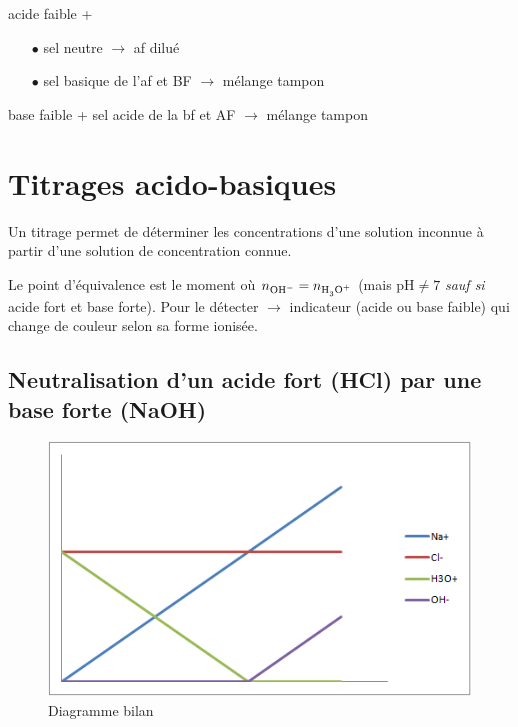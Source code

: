 \documentclass[11pt,a4paper,french]{article}
\begin{document}
acide faible +
\begin{itemize}
\item[$\bullet$] sel neutre $\rightarrow$ af dilué
\item[$\bullet$] sel basique de l'af et BF $\rightarrow$ mélange tampon
\end{itemize}

base faible + sel acide de la bf et AF $\rightarrow$ mélange tampon

\section{Titrages acido-basiques}
Un titrage permet de déterminer les concentrations d'une solution inconnue à partir d'une solution de concentration connue.

Le point d'équivalence est le moment où $n_{\ce{OH-}} = n_{\ce{H3O+}}$ (mais pH$\neq 7$ \emph{sauf si} acide fort et base forte).
Pour le détecter $\rightarrow$ indicateur (acide ou base faible) qui change de couleur selon sa forme ionisée.

\subsection{Neutralisation d'un acide fort (HCl) par une base forte (NaOH)}

\begin{figure}[ht!]
\centering
\includegraphics[scale=0.7]{DiagBilanAFBF.png}
\caption{Diagramme bilan}
\end{figure}
\end{document}
